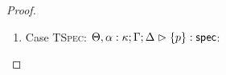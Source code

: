 \begin{proof}
\begin{enumerate}
  First, the syntax:
  \begin{tabbedproof}
    \oo By inversion, $\judgeS[\Theta, \alpha:\kappa; \Gamma; \Delta]{S}$\\
    \oo By inversion, $\judgeS[\Theta, \alpha:\kappa; \Gamma; \Delta]{S'}$\\
    \oo By induction, $\judgeS[\Theta; {[\tau/\alpha]}\Gamma; {[\tau/\alpha]}\Delta]{{[\tau/\alpha]}S}$\\
    \oo By induction, $\judgeS[\Theta; {[\tau/\alpha]}\Gamma; {[\tau/\alpha]}\Delta]{{[\tau/\alpha]}S'}$\\
    \oo By rule, $\judgeS[\Theta; {[\tau/\alpha]}\Gamma; {[\tau/\alpha]}\Delta]{{[\tau/\alpha]}S \oplus {[\tau/\alpha]}S'}$\\
    \oo By subst def, $\judgeS[\Theta; {[\tau/\alpha]}\Gamma; {[\tau/\alpha]}\Delta]{{[\tau/\alpha]}(S \oplus S')}$\\
  \end{tabbedproof}

  For semantics, consider $\interp{\judgeS[\Theta; {[\tau/\alpha]}\Gamma; {[\tau/\alpha]}\Delta]{{[\tau/\alpha]}(S \oplus S')}}\;\theta\;\gamma\;\delta$
  \begin{eqnproof}
    {Semantics}
    {Induction}
          {Semantics}
  \end{eqnproof}
  The correctness of the application of $\gamma$ and $\delta$ follows from the equations for
  contexts under substitution. 

\item Case \textsc{TSpec}: $\judgeS[\Theta, \alpha:\kappa; \Gamma; \Delta]{\setof{p}}$:
  

\end{enumerate}
\end{proof}
